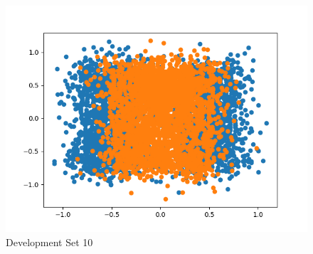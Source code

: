 \documentclass{article}
\begin{document}
\begin{figure}[H]
\begin{minipage}{.33\textwidth}
			\includegraphics[width=1\linewidth]{../DevSet 10.png}
			\caption{Development Set 10}
	\end{minipage}\hfill
\end{figure}
\end{document}
